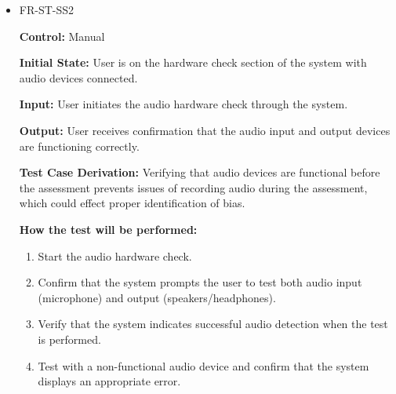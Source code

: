 \documentclass[12pt, titlepage]{article}
\begin{document}
\begin{itemize}
  \item FR-ST-SS2
    \begin{mdframed}[linewidth=0.5mm]
      \textbf{Control:} Manual \par
      \textbf{Initial State:} User is on the hardware check section of the system with audio devices connected. \par
      \textbf{Input:} User initiates the audio hardware check through the system. \par
      \textbf{Output:} User receives confirmation that the audio input and output devices are functioning correctly. \par
      \textbf{Test Case Derivation:} Verifying that audio devices are functional before the assessment prevents issues of recording audio during
      the assessment, which could effect proper identification of bias. \par
      \textbf{How the test will be performed:}
      \begin{enumerate}[noitemsep]
        \item Start the audio hardware check.
        \item Confirm that the system prompts the user to test both audio input (microphone) and output (speakers/headphones).
        \item Verify that the system indicates successful audio detection when the test is performed.
        \item Test with a non-functional audio device and confirm that the system displays an appropriate error.
      \end{enumerate}
    \end{mdframed}


\end{itemize}
\end{document}
